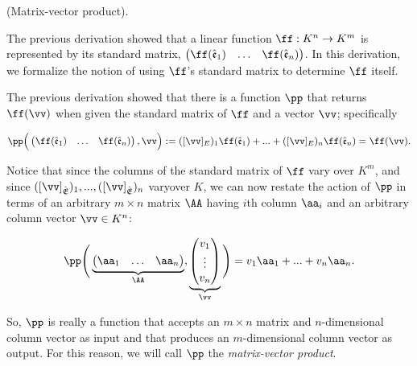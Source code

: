 \begin{deriv}
    (Matrix-vector product).
    
    The previous derivation showed that a linear function $\ff:K^n \rightarrow K^m$ is represented by its standard matrix, $\begin{pmatrix} \ff(\see_1) & \hdots & \ff(\see_n) \end{pmatrix}$. In this derivation, we formalize the notion of using $\ff$'s standard matrix to determine $\ff$ itself.
    
    The previous derivation showed that there is a function $\pp$ that returns $\ff(\vv)$ when given the standard matrix of $\ff$ and a vector $\vv$; specifically
    
    \begin{align*}
        \pp\Big( \begin{pmatrix} \ff(\see_1) & \hdots & \ff(\see_n) \end{pmatrix}, \vv \Big) := ([\vv]_E)_1 \ff(\see_1) + ... + ([\vv]_E)_n \ff(\see_n) = \ff(\vv).
    \end{align*}
    
    Notice that since the columns of the standard matrix of $\ff$ vary over $K^m$, and since $([\vv]_\sE)_1, ..., ([\vv]_\sE)_n$ vary\footnotemark over $K$, we can now restate the action of $\pp$ in terms of an arbitrary $m \times n$ matrix $\AA$ having $i$th column $\aa_i$ and an arbitrary column vector $\vv \in K^n$:
    
    
    \begin{align*}
        \pp\Bigg(
            \underbrace
            {\begin{pmatrix} 
                \aa_1 & \hdots & \aa_n
            \end{pmatrix}}_\AA,
            \underbrace{
            \begin{pmatrix} 
                v_1 \\ \vdots \\ v_n 
            \end{pmatrix}}_\vv
            \Bigg)
            =
            v_1 \aa_1 + ... + v_n \aa_n.
    \end{align*}
    
    So, $\pp$ is really a function that accepts an $m \times n$ matrix and $n$-dimensional column vector as input and that produces an $m$-dimensional column vector as output. For this reason, we will call $\pp$ the \textit{matrix-vector product}.
    

\end{deriv}
